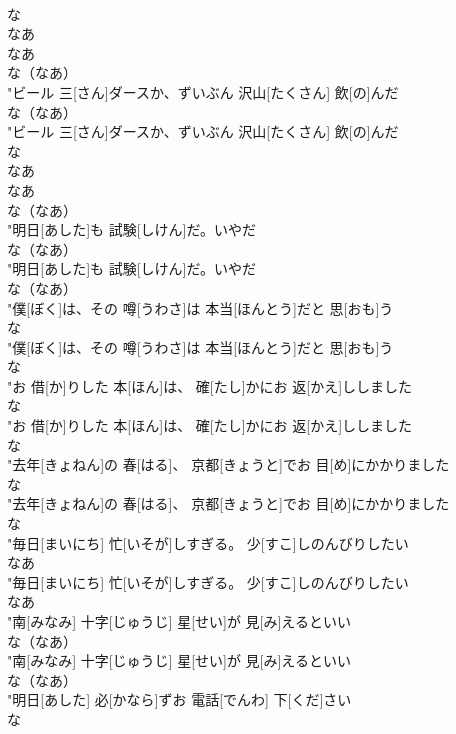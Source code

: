 \documentclass[8pt]{extreport}
\begin{document}
\begin{CJK}{UTF8}{min}
\\	な 
\\	なあ 
\\	なあ 
\\	な（なあ）
\\	"ビール 三[さん]ダースか、ずいぶん 沢山[たくさん] 飲[の]んだ
\\	な（なあ）
\\	"ビール 三[さん]ダースか、ずいぶん 沢山[たくさん] 飲[の]んだ
\\	な 
\\	なあ 
\\	なあ 
\\	な（なあ）
\\	"明日[あした]も 試験[しけん]だ。いやだ
\\	な（なあ）
\\	"明日[あした]も 試験[しけん]だ。いやだ
\\	な（なあ）
\\	"僕[ぼく]は、その 噂[うわさ]は 本当[ほんとう]だと 思[おも]う
\\	な
\\	"僕[ぼく]は、その 噂[うわさ]は 本当[ほんとう]だと 思[おも]う
\\	な
\\	"お 借[か]りした 本[ほん]は、 確[たし]かにお 返[かえ]ししました
\\	な
\\	"お 借[か]りした 本[ほん]は、 確[たし]かにお 返[かえ]ししました
\\	な
\\	"去年[きょねん]の 春[はる]、 京都[きょうと]でお 目[め]にかかりました
\\	な
\\	"去年[きょねん]の 春[はる]、 京都[きょうと]でお 目[め]にかかりました
\\	な
\\	"毎日[まいにち] 忙[いそが]しすぎる。 少[すこ]しのんびりしたい
\\	なあ
\\	"毎日[まいにち] 忙[いそが]しすぎる。 少[すこ]しのんびりしたい
\\	なあ
\\	"南[みなみ] 十字[じゅうじ] 星[せい]が 見[み]えるといい
\\	な（なあ）
\\	"南[みなみ] 十字[じゅうじ] 星[せい]が 見[み]えるといい
\\	な（なあ）
\\	"明日[あした] 必[かなら]ずお 電話[でんわ] 下[くだ]さい
\\	な

\end{CJK}
\end{document}
